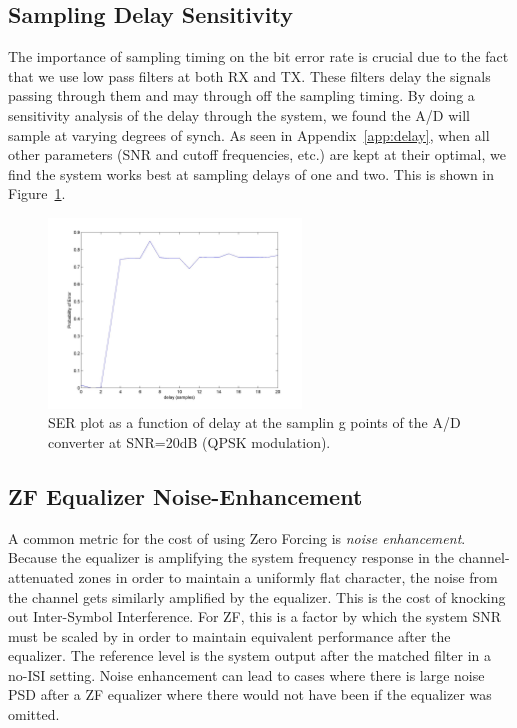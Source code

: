 \documentclass[]{article}
\begin{document}
\subsection{Sampling Delay Sensitivity}
\label{sec:delaySensitivity}
The importance of sampling timing on the bit error rate is crucial due to the fact that we use low pass filters at both RX and TX.  These filters delay the signals passing through them and may through off the sampling timing. By doing a sensitivity analysis of the delay through the system, we found the A/D will sample at varying degrees of synch.  As seen in Appendix~\ref{app:delay}, when all other parameters (SNR and cutoff frequencies, etc.) are kept at their optimal, we find the system works best at sampling delays of one and two. This is shown in Figure~\ref{fig:delay}.

\begin{figure}[H]
\centering
\includegraphics[width=0.6\textwidth]{delaySensitivity.jpg}
\caption{SER plot as a function of delay at the samplin g points of the A/D converter at SNR=20dB (QPSK modulation). \label{fig:delay}}
\end{figure}

\subsection{ZF Equalizer Noise-Enhancement}
\label{sec:noiseEnhancement}
A common metric for the cost of using Zero Forcing is \emph{noise enhancement}.  Because the equalizer is amplifying the system frequency response in the channel-attenuated zones in order to maintain a uniformly flat character, the noise from the channel gets similarly amplified by the equalizer.  This is the cost of knocking out Inter-Symbol Interference.  For ZF, this is a factor by which the system SNR must be scaled by in order to maintain equivalent performance after the equalizer.  The reference level is the system output after the matched filter in a no-ISI setting.  Noise enhancement can lead to cases where there is large noise PSD after a ZF equalizer where there would not have been if the equalizer was omitted.
\end{document}
